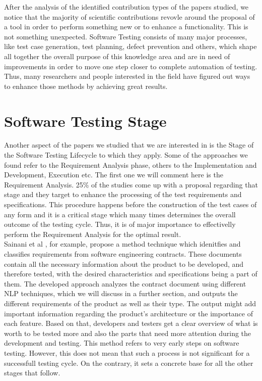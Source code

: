 After the analysis of the identified contribution types of the papers studied, we notice that the majority of scientific contributions revovle around 
the proposal of a tool in order to perform something new or to enhance a functionality. This is not something unexpected. Software Testing consists of many major processes, like 
test case generation, test planning, defect prevention and others, which shape all together the overall purpose of this knowledge area and are in need of improvements in order to move one step 
closer to complete automation of testing. Thus, many researchers and people interested in the field have figured out ways to enhance those methods by achieving great results.

\section {Software Testing Stage}
Another aspect of the papers we studied that we are interested in is the Stage of the Software Testing Lifecycle to which they apply. Some of the approaches we found refer to 
the Requirement Analysis phase, others to the Implementation and Development, Execution etc. The first one we will comment here is the Requirement Analysis. 25\% of the studies 
come up with a proposal regarding that stage and they target to enhance the processing of the test requirements and specifications. This procedure happens before the construction 
of the test cases of any form and it is a critical stage which many times determines the overall outcome of the testing cycle. Thus, it is of major importance to effectivelly 
perform the Requirement Analysis for the optimal result. \\

Sainani et al \cite{reqclass}, for example, propose a method technique which idenitfies and classifies requirements from software engineering contracts. These documents contain all 
the necessary information about the product to be developed, and therefore tested, with the desired characteristics and specifications being a part of them. The developed approach 
analyzes the contract document using different NLP techniques, which we will discuss in a further section, and outputs the different requirements of the product as well as their type. 
The output might add important information regarding the product's architecture or the importance of each feature. Based on that, developers and testers get a clear overview of what 
is worth to be tested more and also the parts that need more attention during the development and testing. This method refers to very early steps on software testing. However, 
this does not mean that such a process is not significant for a successfull testing cycle. On the contrary, it sets a concrete base for all the other stages that follow. \\


